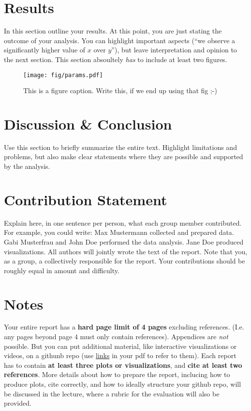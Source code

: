 \documentclass{article}
\theoremstyle{plain}
\theoremstyle{definition}
\theoremstyle{remark}
\begin{document}
\section{Results}\label{sec:results}

In this section outline your results. At this point, you are just stating the outcome of your analysis. 
You can highlight important aspects (``we observe a significantly higher value of $x$ over $y$''), but leave interpretation and opinion to the next section. This section absoultely \emph{has} to include at least two figures.

\begin{figure*}
    \texttt{[image: fig/params.pdf]}
    \caption{This is a figure caption. Write this, if we end up using that fig ;-)}
\end{figure*}

\section{Discussion \& Conclusion}\label{sec:conclusion}

Use this section to briefly summarize the entire text. Highlight limitations and problems, but also make clear statements where they are possible and supported by the analysis. 

\section*{Contribution Statement}

Explain here, in one sentence per person, what each group member contributed. For example, you could write: Max Mustermann collected and prepared data. Gabi Musterfrau and John Doe performed the data analysis. Jane Doe produced visualizations. All authors will jointly wrote the text of the report. Note that you, as a group, a collectively responsible for the report. Your contributions should be roughly equal in amount and difficulty.

\section*{Notes} 

Your entire report has a \textbf{hard page limit of 4 pages} excluding references. (I.e. any pages beyond page 4 must only contain references). Appendices are \emph{not} possible. But you can put additional material, like interactive visualizations or videos, on a githunb repo (use \href{https://github.com/pnkraemer/tueplots}{links} in your pdf to refer to them). Each report has to contain \textbf{at least three plots or visualizations}, and \textbf{cite at least two references}. More details about how to prepare the report, inclucing how to produce plots, cite correctly, and how to ideally structure your github repo, will be discussed in the lecture, where a rubric for the evaluation will also be provided.




\end{document}
